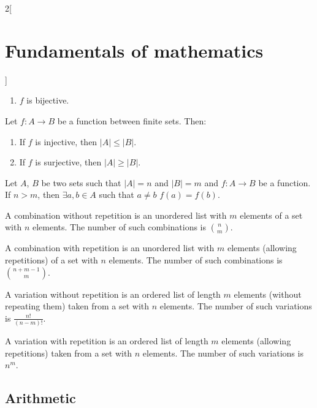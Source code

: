 \documentclass[../../../main.tex]{subfiles}
\begin{document}
\begin{multicols}{2}[\section{Fundamentals of mathematics}]
\begin{prop}
\begin{enumerate}
            \item $f$ is bijective.
        \end{enumerate}
    \end{prop}
    \begin{corollary}
        Let $f:A\rightarrow B$ be a function between finite sets. Then:
        \begin{enumerate}
            \item If $f$ is injective, then $|A|\leq|B|$.
            \item If $f$ is surjective, then $|A|\geq|B|$.
        \end{enumerate}
    \end{corollary}
    \begin{theorem}
        Let $A$, $B$ be two sets such that $|A|=n$ and $|B|=m$ and $f:A\rightarrow B$ be a function. If $n>m$, then $\exists a,b\in A$ such that $a\ne b$ $f(a)=f(b)$.
    \end{theorem}
    \begin{prop}
        A combination without repetition is an unordered list with $m$ elements of a set with $n$ elements. The number of such combinations is $\binom{n}{m}$.
    \end{prop}
    \begin{prop}
        A combination with repetition is an unordered list with $m$ elements (allowing repetitions) of a set with $n$ elements. The number of such combinations is  $\binom{n+m-1}{m}$.
    \end{prop}
    \begin{prop}
        A variation without repetition is an ordered list of length $m$ elements (without repeating them) taken from a set with $n$ elements. The number of such variations is $\frac{n!}{(n-m)!}$.
    \end{prop}
    \begin{prop}
        A variation with repetition is an ordered list of length $m$ elements (allowing repetitions) taken from a set with $n$ elements. The number of such variations is $n^m$.
    \end{prop}
    \subsection{Arithmetic}

\end{multicols}
\end{document}
